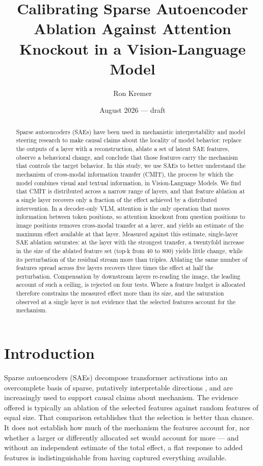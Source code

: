 \documentclass[11pt,a4paper]{article}
\title{\textbf{Calibrating Sparse Autoencoder Ablation Against Attention Knockout in a Vision-Language Model}}
\author{Ron Kremer}
\date{August 2026 --- draft}
\begin{document}
\maketitle

\begin{abstract}
\noindent
Sparse autoencoders (SAEs) have been used in mechanistic interpretability and
model steering research to make causal claims about the locality of model
behavior: replace the outputs of a layer with a reconstruction, ablate a set
of latent SAE features, observe a behavioral change, and conclude that those
features carry the mechanism that controls the target behavior. In this study,
we use SAEs to better understand the mechanism of cross-modal information
transfer (CMIT), the process by which the model combines visual and textual information, in Vision-Language Models. 
We find that CMIT is distributed across a narrow range of layers, and that feature ablation at a single layer
recovers only a fraction of the effect achieved by a distributed intervention.
In a decoder-only VLM, attention is the only operation that moves information
between token positions, so attention knockout from question positions to
image positions removes cross-modal transfer at a layer, and yields an
estimate of the maximum effect available at that layer. Measured against this
estimate, single-layer SAE ablation saturates: at the layer with the strongest
transfer, a twentyfold increase in the size of the ablated feature set (top-k
from 40 to 800) yields little change, while its perturbation of the residual
stream more than triples. Ablating the same number of features spread across
five layers recovers three times the effect at half the perturbation.
Compensation by downstream layers re-reading the image, the leading account of
such a ceiling, is rejected on four tests. Where a feature budget is allocated
therefore constrains the measured effect more than its size, and the saturation 
observed at a single layer is not evidence that the selected features account 
for the mechanism.
\end{abstract}


\section{Introduction}

Sparse autoencoders (SAEs) decompose transformer activations into an
overcomplete basis of sparse, putatively interpretable directions
\citep{bricken2023monosemanticity,templeton2024scaling}, and are increasingly
used to support causal claims about mechanism. The evidence offered is typically
an ablation of the selected features against random features of equal size. That
comparison establishes that the selection is better than chance. It does not
establish how much of the mechanism the features account for, nor whether a
larger or differently allocated set would account for more --- and without an
independent estimate of the total effect, a flat response to added features is
indistinguishable from having captured everything available.
\end{document}

